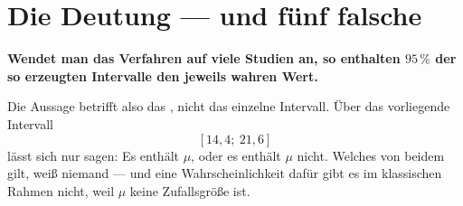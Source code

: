 \section{Die Deutung --- und fünf falsche}

\begin{merksatz}
\begin{center}
\begin{minipage}{0.9\textwidth}
\textbf{Wendet man das Verfahren auf viele Studien an, so enthalten $95\,\%$ der so erzeugten Intervalle den jeweils wahren Wert.}
\end{minipage}
\end{center}

Die Aussage betrifft also das , nicht das einzelne Intervall. Über das vorliegende Intervall
\[ [14{,}4;\ 21{,}6] \]
lässt sich nur sagen: Es enthält $\mu$, oder es enthält $\mu$ nicht. Welches von beidem gilt, weiß niemand --- und eine Wahrscheinlichkeit dafür gibt es im klassischen Rahmen nicht, weil $\mu$ keine Zufallsgröße ist.
\end{merksatz}

